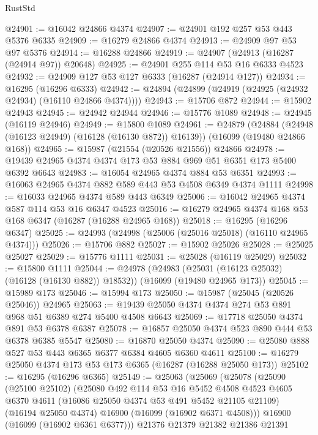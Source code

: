 \begin{lexlean}{RustStd}
\begin{coremodule}
@24901 := @16042 @24866 @4374
@24907 := @24901 @192 @257 @53 @443 @5376 @6335
@24909 := @16279 @24866 @4374
@24913 := @24909 @97 @53 @97 @5376
@24914 := @16288 @24866
@24919 := @24907 (@24913 (@16287 (@24914 @97)) @20648)
@24925 := @24901 @255 @114 @53 @16 @6333 @4523
@24932 := @24909 @127 @53 @127 @6333 (@16287 (@24914 @127))
@24934 := @16295 (@16296 @6333)
@24942 := @24894 (@24899 (@24919 (@24925 (@24932 @24934) (@16110 @24866 @4374))))
@24943 := @15706 @872
@24944 := @15902 @24943
@24945 := @24942 @24944
@24946 := @15776 @1089
@24948 := @24945 (@16119 @24946)
@24949 := @15800 @1089
@24961 := @24879
    (@24884 (@24948 (@16123 @24949) (@16128 (@16130 @872)) @16139))
    (@16099 (@19480 @24866 @168))
@24965 := @15987 (@21554 (@20526 @21556)) @24866
@24978 := @19439 @24965 @4374 @4374 @173 @53 @884 @969 @51 @6351 @173 @5400 @6392 @6643
@24983 := @16054 @24965 @4374 @884 @53 @6351
@24993 := @16063 @24965 @4374 @882 @589 @443 @53 @4508 @6349 @4374 @1111
@24998 := @16033 @24965 @4374 @589 @443 @6349
@25006 := @16042 @24965 @4374 @587 @114 @53 @16 @6347 @4523
@25016 := @16279 @24965 @4374 @168 @53 @168 @6347 (@16287 (@16288 @24965 @168))
@25018 := @16295 (@16296 @6347)
@25025 := @24993 (@24998 (@25006 (@25016 @25018) (@16110 @24965 @4374)))
@25026 := @15706 @882
@25027 := @15902 @25026
@25028 := @25025 @25027
@25029 := @15776 @1111
@25031 := @25028 (@16119 @25029)
@25032 := @15800 @1111
@25044 := @24978
    (@24983 (@25031 (@16123 @25032) (@16128 (@16130 @882)) @18532))
    (@16099 (@19480 @24965 @173))
@25045 := @15989 @173
@25046 := @15994 @173
@25050 := @15987 (@25045 (@20526 @25046)) @24965
@25063 := @19439 @25050 @4374 @4374 @274 @53 @891 @968 @51 @6389 @274 @5400 @4508 @6643
@25069 := @17718 @25050 @4374 @891 @53 @6378 @6387
@25078 := @16857 @25050 @4374 @523 @890 @444 @53 @6378 @6385 @5547
@25080 := @16870 @25050 @4374
@25090 := @25080 @888 @527 @53 @443 @6365 @6377 @6384 @4605 @6360 @4611
@25100 := @16279 @25050 @4374 @173 @53 @173 @6365 (@16287 (@16288 @25050 @173))
@25102 := @16295 (@16296 @6365)
@25149 := @25063
    (@25069
      (@25078
        (@25090
          (@25100 @25102)
          (@25080
            @492
            @114
            @53
            @16
            @5452
            @4508
            @4523
            @4605
            @6370
            @4611
            (@16086 @25050 @4374 @53 @491 @5452 @21105 @21109)
            (@16194 @25050 @4374)
            @16900
            (@16099 (@16902 @6371 @4508)))
          @16900
          (@16099 (@16902 @6361 @6377)))
        @21376
        @21379
        @21382
        @21386
        @21391

\end{coremodule}
\end{lexlean}
